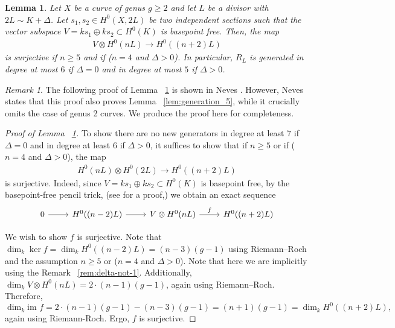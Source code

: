 \documentclass{amsart}
\theoremstyle{plain}
\newtheorem{lem}[thm]{Lemma}
\theoremstyle{definition}
\theoremstyle{remark}
\newtheorem{rem}[thm]{Remark}
\numberwithin{equation}{section}
\newcommand\im{\text{im }}
\begin{document}
\begin{lem}
\label{lem:semicanonical_generation}
Let $X$ be a curve of genus $g \geq 2$ and let $L$ be a divisor with $2 L \sim K + \Delta$. Let $s_1,s_2 \in H^0(X,2L)$ be two independent sections such that the vector subspace $V = ks_1 \oplus k s_2 \subset H^0(K)$ is basepoint free. Then, the map
\begin{align*}
	V \otimes H^0(nL) \rightarrow H^0((n+2)L)
\end{align*}
is surjective if $n \geq 5$ and if {\rm(}$n = 4$ and $\Delta > 0${\rm)}.
In particular, $R_L$ is generated in degree at most $6$ if $\Delta = 0$ and in degree at most $5$ if $\Delta > 0$.
\end{lem}

\begin{rem}
\label{rem:neves-omission}
The following proof of Lemma ~\ref{lem:semicanonical_generation} is shown in Neves \cite[Proposition III.4]{neves:halfcan}. However, Neves states that this proof also proves Lemma ~\ref{lem:generation_5}, while it crucially omits the case of genus 2 curves. We produce the proof here for completeness.
\end{rem}

\begin{proof}[Proof of Lemma ~\ref{lem:semicanonical_generation}]
To show there are no new generators in degree at least $7$ if $\Delta = 0$ and in degree at least $6$ if $\Delta > 0$, it suffices to show that if $n \geq 5$ or if ($n = 4$ and $\Delta > 0$), the map
\begin{align*}
	H^0(nL) \otimes H^0(2L) \rightarrow H^0((n+2)L)
\end{align*}
is surjective. Indeed, since $V= ks_1 \oplus k s_2 \subset H^0(K)$ is basepoint free, by the basepoint-free pencil trick, (see \cite[Lemma 2.6]{saint-donat:proj} for a proof,) we obtain an exact sequence
$$\begin{tikzcd}
0 \ar r & H^0((n-2)L) \ar r & V \otimes H^0(nL) \ar{r}{f} & H^0((n+2)L)
\end{tikzcd}$$


We wish to show $f$ is surjective.
Note that $\dim_k \ker f = \dim_k H^0((n-2)L) = (n-3)(g - 1)$ using Riemann--Roch and the assumption $n \geq 5$ or ($n = 4$ and $\Delta > 0$). Note that here we are implicitly using the Remark ~\ref{rem:delta-not-1}.
Additionally, $\dim_k V \otimes H^0(nL) = 2 \cdot (n- 1)(g - 1)$, again using Riemann--Roch.
Therefore, $$\dim_k \im f = 2 \cdot (n- 1)(g - 1) -(n-3)(g - 1) = (n+ 1)(g - 1) = \dim_k H^0((n+2)L),$$
again using Riemann-Roch. Ergo, $f$ is surjective.
\end{proof}
\end{document}

